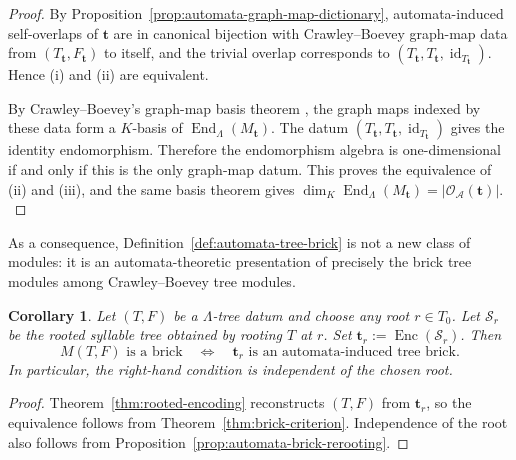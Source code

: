 \documentclass[11pt,a4paper]{amsart}
\newcommand{\Enc}{\operatorname{Enc}}
\theoremstyle{definition}
\theoremstyle{plain}
\newtheorem{corollary}[definition]{Corollary}
\theoremstyle{remark}
\numberwithin{equation}{section}
\begin{document}
\begin{proof}
By Proposition~\ref{prop:automata-graph-map-dictionary}, automata-induced self-overlaps of $\mathbf t$ are in canonical bijection with Crawley--Boevey graph-map data from $(T_{\mathbf t},F_{\mathbf t})$ to itself, and the trivial overlap corresponds to $(T_{\mathbf t},T_{\mathbf t},\operatorname{id}_{T_{\mathbf t}})$. Hence \textup{(i)} and \textup{(ii)} are equivalent.

By Crawley--Boevey's graph-map basis theorem \cite[\S 2]{CB89}, the graph maps indexed by these data form a $K$-basis of $\operatorname{End}_{\Lambda}(M_{\mathbf t})$. The datum $(T_{\mathbf t},T_{\mathbf t},\operatorname{id}_{T_{\mathbf t}})$ gives the identity endomorphism. Therefore the endomorphism algebra is one-dimensional if and only if this is the only graph-map datum. This proves the equivalence of \textup{(ii)} and \textup{(iii)}, and the same basis theorem gives
$
\dim_K\operatorname{End}_{\Lambda}(M_{\mathbf t})
=
|\mathscr O_{\mathcal A}(\mathbf t)|.
$
\end{proof}

As a consequence, Definition~\ref{def:automata-tree-brick} is not a new class of modules: it is an automata-theoretic presentation of precisely the brick tree modules among Crawley--Boevey tree modules.

\begin{corollary}\label{cor:tree-datum-automata-brick}
Let $(T,F)$ be a $\Lambda$-tree datum and choose any root $r\in T_0$. Let $\mathcal S_r$ be the rooted syllable tree obtained by rooting $T$ at $r$. Set $\mathbf t_r:=\Enc(\mathcal S_r)$. Then
\[
M(T,F)\text{ is a brick}\quad\Longleftrightarrow\quad\mathbf t_r\text{ is an automata-induced tree brick}.
\]
In particular, the right-hand condition is independent of the chosen root.
\end{corollary}

\begin{proof}
Theorem~\ref{thm:rooted-encoding} reconstructs $(T,F)$ from $\mathbf t_r$, so the equivalence follows from Theorem~\ref{thm:brick-criterion}. Independence of the root also follows from Proposition~\ref{prop:automata-brick-rerooting}.
\end{proof}
\end{document}
